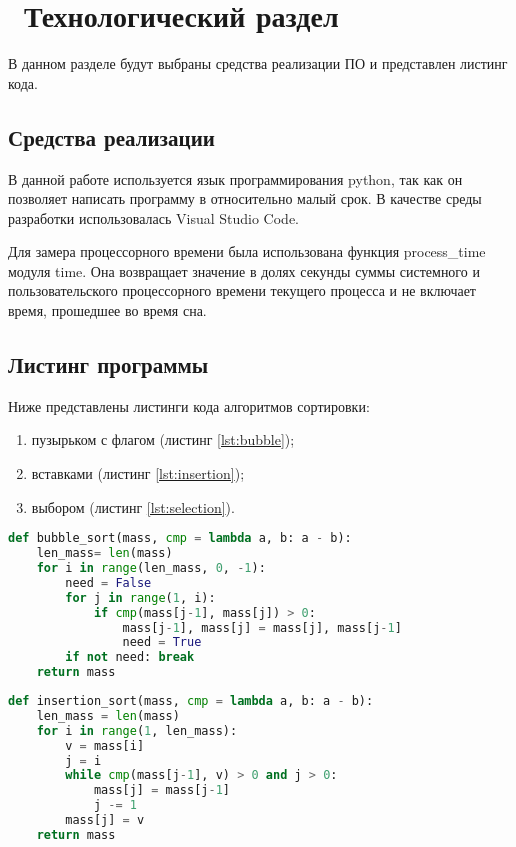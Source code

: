 \chapter{ Технологический раздел}
\label{cha:technological}

    В данном разделе будут выбраны средства реализации ПО и представлен листинг кода. 

    \section{Средства реализации}
        В данной работе используется язык программирования python, так как
        он позволяет написать программу в относительно малый срок.
        В качестве среды разработки использовалась Visual Studio Code. \cite{python}\cite{visual-studio-code}

        Для замера процессорного времени была использована функция process\_time модуля time. \cite{process_time}
        Она возвращает значение в долях секунды суммы системного и пользовательского процессорного времени текущего процесса и 
        не включает время, прошедшее во время сна.

    \section{Листинг программы}
        Ниже представлены листинги кода алгоритмов сортировки:
        \begin{enumerate}
            \item пузырьком с флагом (листинг \ref{lst:bubble});
            \item вставками (листинг \ref{lst:insertion});
            \item выбором (листинг \ref{lst:selection}).
        \end{enumerate}
        
        \begin{lstlisting}[language=python, label=lst:bubble, caption=Реализация алгоритма сортировки пузырьком с флагом]
def bubble_sort(mass, cmp = lambda a, b: a - b):
    len_mass= len(mass)
    for i in range(len_mass, 0, -1):
        need = False
        for j in range(1, i):
            if cmp(mass[j-1], mass[j]) > 0:
                mass[j-1], mass[j] = mass[j], mass[j-1]
                need = True
        if not need: break
    return mass
        \end{lstlisting}

        \begin{lstlisting}[language=python, label=lst:insertion, caption=Реализация алгоритма сортировки вставками]
def insertion_sort(mass, cmp = lambda a, b: a - b):
    len_mass = len(mass)
    for i in range(1, len_mass):
        v = mass[i]
        j = i
        while cmp(mass[j-1], v) > 0 and j > 0:
            mass[j] = mass[j-1]
            j -= 1
        mass[j] = v
    return mass
        \end{lstlisting}

